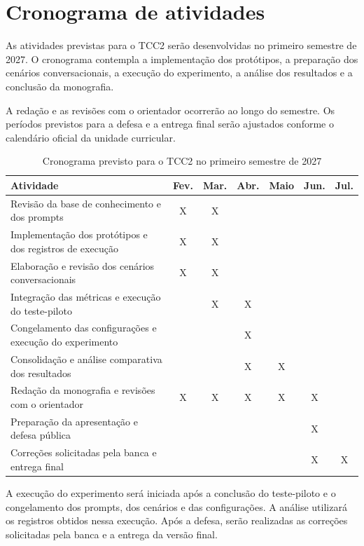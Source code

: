\chapter{Cronograma de atividades}
\label{cap:cronograma}

As atividades previstas para o TCC2 serão desenvolvidas no primeiro
semestre de 2027. O cronograma contempla a implementação dos protótipos,
a preparação dos cenários conversacionais, a execução do experimento,
a análise dos resultados e a conclusão da monografia.

A redação e as revisões com o orientador ocorrerão ao longo do semestre.
Os períodos previstos para a defesa e a entrega final serão ajustados
conforme o calendário oficial da unidade curricular.

\begin{table}[htb]
    \centering
    \caption{Cronograma previsto para o TCC2 no primeiro semestre de 2027}
    \label{tab:cronograma-tcc2}
    \small
    \begin{tabular}{p{}cccccc}
        \hline
        \textbf{Atividade}
        & \textbf{Fev.} & \textbf{Mar.} & \textbf{Abr.}
        & \textbf{Maio} & \textbf{Jun.} & \textbf{Jul.} \\
        \hline
        Revisão da base de conhecimento e dos prompts
        & X & X & & & & \\

        Implementação dos protótipos e dos registros de execução
        & X & X & & & & \\

        Elaboração e revisão dos cenários conversacionais
        & X & X & & & & \\

        Integração das métricas e execução do teste-piloto
        & & X & X & & & \\

        Congelamento das configurações e execução do experimento
        & & & X & & & \\

        Consolidação e análise comparativa dos resultados
        & & & X & X & & \\

        Redação da monografia e revisões com o orientador
        & X & X & X & X & X & \\

        Preparação da apresentação e defesa pública
        & & & & & X & \\

        Correções solicitadas pela banca e entrega final
        & & & & & X & X \\
        \hline
    \end{tabular}
    \fonteproprioautor
\end{table}

A execução do experimento será iniciada após a conclusão do teste-piloto
e o congelamento dos prompts, dos cenários e das configurações.
A análise utilizará os registros obtidos nessa execução. Após a defesa,
serão realizadas as correções solicitadas pela banca e a entrega da
versão final.
